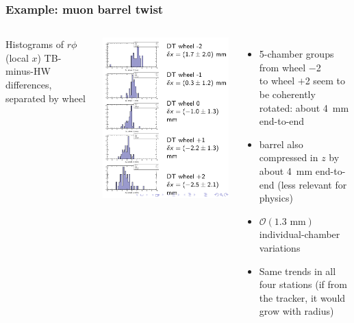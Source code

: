 \documentclass[compress]{beamer}
\begin{document}
\begin{frame}
\frametitle{Example: muon barrel twist}
\begin{columns}
Histograms of $r\phi$ (local $x$) TB-minus-HW differences, separated by wheel

\includegraphics[width=\linewidth]{twist1.png}

\begin{itemize}\setlength{\itemsep}{0.1 cm}
\item 5-chamber groups from wheel $-$2 \\ to wheel $+$2 seem to be coherently rotated: about 4~mm end-to-end
\item barrel also compressed in $z$ by about 4~mm end-to-end (less relevant for physics)
\item $\mathcal{O}(1.3\mbox{ mm})$ individual-chamber variations
\item<2> Same trends in all four stations (if from the
  tracker, it would grow with radius)
\end{itemize}


\end{columns}
\end{frame}
\end{document}
